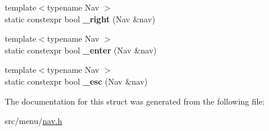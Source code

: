 \begin{DoxyCompactItemize}
\item 
\mbox{\label{structDrift_a69fc62d24473157d5966b178119f31fc}} 
{\footnotesize template$<$typename Nav $>$ }\\static constexpr bool {\bfseries \+\_\+right} (Nav \&nav)
\item 
\mbox{\label{structDrift_a701c7e60548c5b4490cb9662a089d08d}} 
{\footnotesize template$<$typename Nav $>$ }\\static constexpr bool {\bfseries \+\_\+enter} (Nav \&nav)
\item 
\mbox{\label{structDrift_af86c1b134806fbfb3127a6a4ca9e7ea3}} 
{\footnotesize template$<$typename Nav $>$ }\\static constexpr bool {\bfseries \+\_\+esc} (Nav \&nav)
\end{DoxyCompactItemize}


The documentation for this struct was generated from the following file\+:\begin{DoxyCompactItemize}
\item 
src/menu/\hyperlink{nav_8h}{nav.\+h}\end{DoxyCompactItemize}
